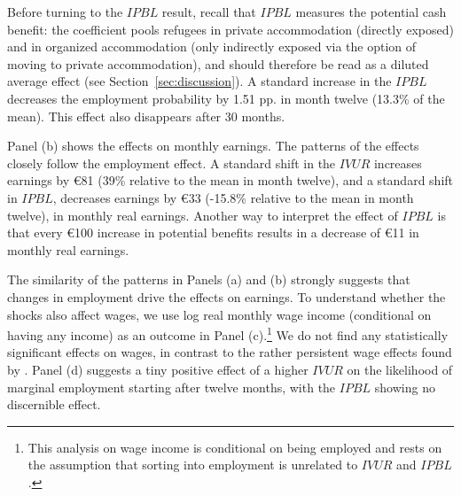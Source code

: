 Before turning to the $IPBL$ result, recall that $IPBL$ measures the potential cash benefit: the coefficient pools refugees in private accommodation (directly exposed) and in organized accommodation (only indirectly exposed via the option of moving to private accommodation), and should therefore be read as a diluted average effect (see Section~\ref{sec:discussion}). A standard increase in the $IPBL$ decreases the employment probability by 1.51 pp. in month twelve (13.3\% of the mean). This effect also disappears after 30 months.

Panel (b) shows the effects on monthly earnings. The patterns of the effects closely follow the employment effect. A standard shift in the $IVUR$ increases earnings by €81 (39\% relative to the mean in month twelve), and a standard shift in $IPBL$, decreases earnings by €33 (-15.8\% relative to the mean in month twelve), in monthly real earnings. Another way to interpret the effect of $IPBL$ is that every €100 increase in potential benefits results in a decrease of €11 in monthly real earnings.

The similarity of the patterns in Panels (a) and (b) strongly suggests that changes in employment drive the effects on earnings. To understand whether the shocks also affect wages, we use log real monthly wage income (conditional on having any income) as an outcome in Panel (c).\footnote{This analysis on wage income is conditional on being employed and rests on the assumption that sorting into employment is unrelated to $IVUR$ and $IPBL$.} We do not find any statistically significant effects on wages, in contrast to the rather persistent wage effects found by \citet{barsbai2024}. Panel (d) suggests a tiny positive effect of a higher $IVUR$ on the likelihood of marginal employment starting after twelve months, with the $IPBL$ showing no discernible effect.


